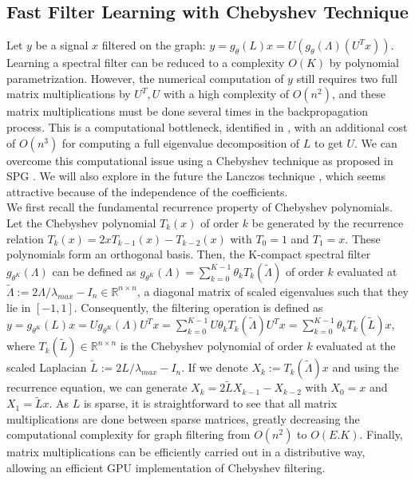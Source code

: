 \documentclass{article}
\newcommand{\R}{\mathbb{R}}
\begin{document}
\subsection{Fast Filter Learning with Chebyshev Technique}
\vspace{-0.2cm}
Let $y$ be a signal $x$ filtered on the graph: $y=g_\theta(L)x=U(g_\theta(\Lambda) (U^Tx))$. Learning a spectral filter can be reduced to a complexity $O(K)$ by polynomial parametrization. However, the numerical computation of $y$ still requires two full matrix multiplications by $U^T,U$ with a high complexity of $O(n^2)$, and these matrix multiplications must be done several times in the backpropagation process. This is a computational bottleneck, identified in \cite{art:HenaffBrunaLeCun15DLgraphs}, with an additional cost of $O(n^3)$ for computing a full eigenvalue decomposition of $L$ to get $U$. We can overcome this computational issue using a Chebyshev technique as proposed in SPG \cite{art:HammondVandergheynstGribonval11GraphWav}. We will also explore in the future the Lanczos technique \cite{art:SusnjaraPerraudinKressnerVandergheynst15Lanczos}, which seems attractive because of the independence of the coefficients. \\
We first recall the fundamental recurrence property of Chebyshev polynomials. Let the Chebyshev polynomial \(T_k(x)\) of order \(k\) be generated by the recurrence relation \(T_k(x) = 2x T_{k-1}(x) - T_{k-2}(x)\) with \(T_0 = 1\) and
\(T_1 = x\). These polynomials form an orthogonal basis. Then, the K-compact spectral filter $g_{\theta^K}(\Lambda)$ can be defined as $g_{\theta^K}(\Lambda)=\sum_{k=0}^{K-1}\theta_k T_k(\tilde{\Lambda})$ of order \(k\) evaluated at
\(\tilde{\Lambda} := 2 \Lambda / \lambda_{max} - I_n \in \R^{n \times n}\), a diagonal matrix of scaled eigenvalues such that they lie in \([-1,1]\). Consequently, the filtering operation is defined as $y=g_{\theta^K}(L)x=Ug_{\theta^K}(\Lambda) U^Tx=\sum_{k=0}^{K-1} U \theta_k T_k(\tilde{\Lambda}) U^Tx=\sum_{k=0}^{K-1} \theta_k T_k(\tilde{L}) x$, where \(T_k(\tilde{L}) \in \R^{n \times n}\) is the Chebyshev polynomial of order \(k\) evaluated at the scaled Laplacian
\(\tilde{L} := 2 L / \lambda_{max} - I_n\). If we denote $X_k:=T_k(\tilde{\Lambda})x$ and using the recurrence equation, we can generate $X_k=2\tilde{L}X_{k-1}-X_{k-2}$ with \(X_0 = x\) and \(X_1 = \tilde{L} x\). As $L$ is sparse, it is straightforward to see that all matrix multiplications are done between sparse matrices, greatly decreasing the computational complexity for graph filtering from $O(n^2)$ to $O(E.K)$. Finally, matrix multiplications can be efficiently carried out in a distributive way, allowing an efficient GPU implementation of Chebyshev filtering.
\end{document}
